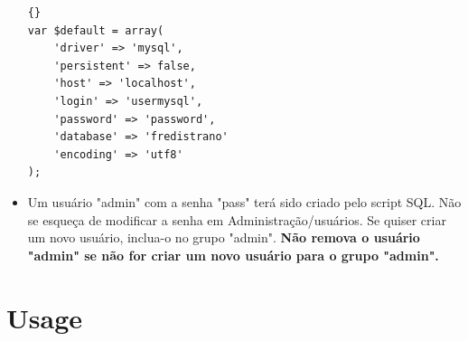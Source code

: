 \documentclass[12pt,a4paper]{report}
\begin{document}
\begin{itemize}
\begin{lstlisting}[frame=tb]{}
var $default = array(
	'driver' => 'mysql',
	'persistent' => false,
	'host' => 'localhost',
	'login' => 'usermysql',
	'password' => 'password',
	'database' => 'fredistrano'
	'encoding' => 'utf8'
);
\end{lstlisting}

\item Um usuário "admin" com a senha "pass" terá sido criado pelo script SQL.  Não se esqueça de modificar a senha em Administração/usuários.
Se quiser criar um novo usuário, inclua-o no grupo "admin".
\textbf{Não remova o usuário "admin" se não for criar um novo usuário para o grupo "admin".}

\end{itemize}

\chapter{Usage}
\end{document}
